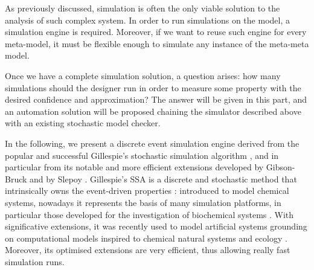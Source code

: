 \documentclass[12pt,a4paper,twoside,openright]{book}
\begin{document}
As previously discussed, simulation is often the only viable solution to the analysis of such complex system.
%
In order to run simulations on the model, a simulation engine is required.
%
Moreover, if we want to reuse such engine for every meta-model, it must be flexible enough to simulate any instance of the meta-meta model.

Once we have a complete simulation solution, a question arises: how many simulations should the designer run in order to measure some property with the desired confidence and approximation?
%
The answer will be given in this part, and an automation solution will be proposed chaining the simulator described above with an existing stochastic model checker.

In the following, we present a discrete event simulation engine derived from the popular and successful Gillespie's stochastic simulation algorithm \cite{gillespie1977}, and in particular from its notable and more efficient extensions developed by Gibson-Bruck \cite{gibson2000} and by Slepoy \cite{slepoy2008}.   
%
Gillespie's SSA is a discrete and stochastic method that intrinsically owns the event-driven properties \cite{spatialeventgillespie}: introduced to model chemical systems, nowadays it represents the basis of many simulation platforms, in particular those developed for the investigation of biochemical systems \cite{Priami:2001,Kierzek01032002,CiocchettaH09,versari08,montagna-cs2bio10,btssoc-jos7,Hoops15122006}. 
%
With significative extensions, it was recently used to model artificial systems grounding on computational models inspired to chemical natural systems and ecology \cite{Montagna-MONET2012}.
%
Moreover, its optimised extensions \cite{gibson2000,slepoy2008} are very efficient, thus allowing really fast simulation runs.

\end{document}
